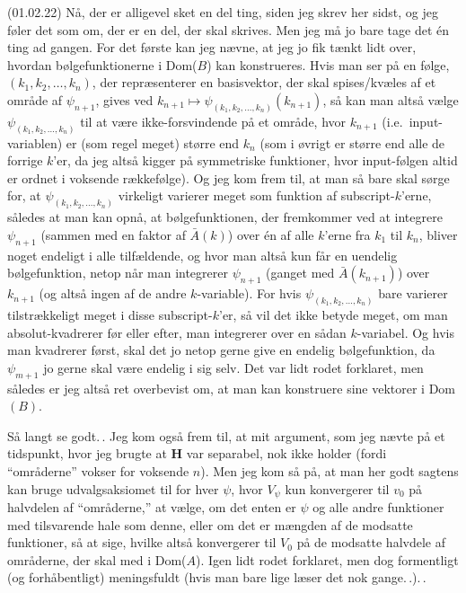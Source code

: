 \documentclass{report}
\begin{document}
(01.02.22) Nå, der er alligevel sket en del ting, siden jeg skrev her sidst, og jeg føler det som om, der er en del, der skal skrives. Men jeg må jo bare tage det én ting ad gangen. For det første kan jeg nævne, at jeg jo fik tænkt lidt over, hvordan bølgefunktionerne i Dom($B$) kan konstrueres. Hvis man ser på en følge, $(k_1, k_2, \ldots, k_n)$, der repræsenterer en basisvektor, der skal spises/kvæles af et område af $\psi_{n+1}$, gives ved $k_{n+1} \mapsto \psi_{(k_1, k_2, \ldots, k_n)}(k_{n+1})$, så kan man altså vælge $\psi_{(k_1, k_2, \ldots, k_n)}$ til at være ikke-forsvindende på et område, hvor $k_{n+1}$ (i.e.\ input-variablen) er (som regel meget) større end $k_n$ (som i øvrigt er større end alle de forrige $k$'er, da jeg altså kigger på symmetriske funktioner, hvor input-følgen altid er ordnet i voksende rækkefølge). Og jeg kom frem til, at man så bare skal sørge for, at $\psi_{(k_1, k_2, \ldots, k_n)}$ virkeligt varierer meget som funktion af subscript-$k$'erne, således at man kan opnå, at bølgefunktionen, der fremkommer ved at integrere $\psi_{n+1}$ (sammen med en faktor af $\bar{A}(k)$) over én af alle $k$'erne fra $k_1$ til $k_n$, bliver noget endeligt i alle tilfældende, og hvor man altså kun får en uendelig bølgefunktion, netop når man integrerer $\psi_{n+1}$ (ganget med $\bar{A}(k_{n+1})$) over $k_{n+1}$ (og altså ingen af de andre $k$-variable). For hvis $\psi_{(k_1, k_2, \ldots, k_n)}$ bare varierer tilstrækkeligt meget i disse subscript-$k$'er, så vil det ikke betyde meget, om man absolut-kvadrerer før eller efter, man integrerer over en sådan $k$-variabel. Og hvis man kvadrerer først, skal det jo netop gerne give en endelig bølgefunktion, da $\psi_{m+1}$ jo gerne skal være endelig i sig selv. Det var lidt rodet forklaret, men således er jeg altså ret overbevist om, at man kan konstruere sine vektorer i Dom$(B)$. 

Så langt se godt.\,. Jeg kom også frem til, at mit argument, som jeg nævte på et tidspunkt, hvor jeg brugte at \textbf{H} var separabel, nok ikke holder (fordi ``områderne'' vokser for voksende $n$). Men jeg kom så på, at man her godt sagtens kan bruge udvalgsaksiomet til for hver $\psi$, hvor $V_\psi$ kun konvergerer til $v_0$ på halvdelen af ``områderne,'' at vælge, om det enten er $\psi$ og alle andre funktioner med tilsvarende hale som denne, eller om det er mængden af de modsatte funktioner, så at sige, hvilke altså konvergerer til $V_0$ på de modsatte halvdele af områderne, der skal med i Dom($A$). Igen lidt rodet forklaret, men dog formentligt (og forhåbentligt) meningsfuldt (hvis man bare lige læser det nok gange.\,.).\,. 
\end{document}
